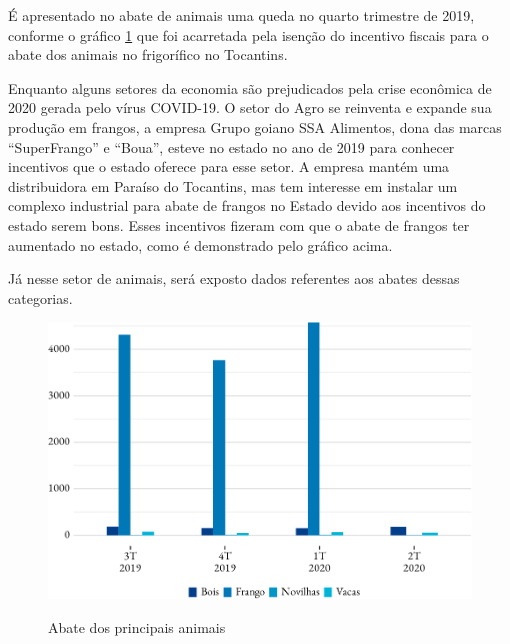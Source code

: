 \par É apresentado no abate de animais uma queda no quarto trimestre de 2019, conforme o gráfico \ref{fig:abate} que foi acarretada pela isenção do incentivo fiscais para o abate dos animais no frigorífico no Tocantins.

\par Enquanto alguns setores da economia são prejudicados pela crise econômica de 2020 gerada pelo vírus COVID-19. O setor do Agro se reinventa e expande sua produção em frangos, a empresa Grupo goiano SSA Alimentos, dona das marcas “SuperFrango” e “Boua”, esteve no estado no ano de 2019 para conhecer incentivos que o estado oferece para esse setor. A empresa mantém uma distribuidora em Paraíso do Tocantins, mas tem interesse em instalar um complexo industrial para abate de frangos no Estado devido aos incentivos do estado serem bons. Esses incentivos fizeram com que o abate de frangos ter aumentado no estado, como é demonstrado pelo gráfico acima.


\par Já nesse setor de animais, será exposto dados referentes aos abates dessas categorias.

\begin{figure}[!h]
	\caption{Abate dos principais animais}
	\includegraphics{fig/abates-1.pdf}
	\label{fig:abate}
\end{figure}
